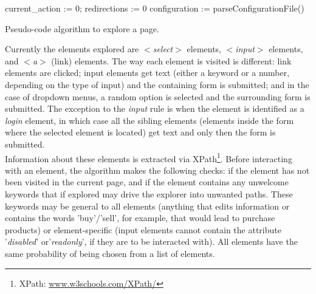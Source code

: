 \documentclass[conference]{IEEEtran}
\begin{document}
\begin{algorithm}
  
  current\_action := 0; redirections := 0\;
  configuration := parseConfigurationFile()\;
  

\caption{Pseudo-code algorithm to explore a page.}\label{alg:seeker}
\end{algorithm}

Currently the elements explored are \textit{$<$select$>$} elements, \textit{$<$input$>$} elements, and \textit{$<$a$>$} (link) elements. The way each element is visited is different: link elements are clicked; input elements get text (either a keyword or a number, depending on the type of input) and the containing form is submitted; and in the case of dropdown menus, a random option is selected and the surrounding form is submitted. The exception to the \textit{input} rule is when the element is identified as a \textit{login} element, in which case all the sibling elements (elements inside the form where the selected element is located) get text and only then the form is submitted.\\

Information about these elements is extracted via XPath\footnote{XPath: \url{www.w3schools.com/XPath/}}. Before interacting with an element, the algorithm makes the following checks: if the element has not been visited in the current page, and if the element contains any unwelcome keywords that if explored may drive the explorer into unwanted paths. These keywords may be general to all elements (anything that edits information or contains the words 'buy'/'sell', for example, that would lead to purchase products) or element-specific (input elements cannot contain the attribute '\textit{disabled}' or'\textit{readonly}', if they are to be interacted with). All elements have the same probability of being chosen from a list of elements.\\
\end{document}
